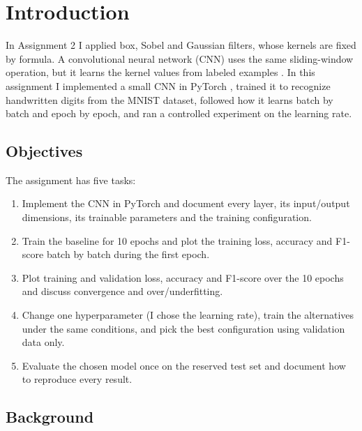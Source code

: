 \chapter{Introduction}
\label{ch:intro}


In Assignment 2 I applied box, Sobel and Gaussian filters, whose kernels
are fixed by formula. A convolutional neural network (CNN) uses the same
sliding-window operation, but it learns the kernel values from labeled
examples \citep{goodfellow2016}. In this assignment I implemented a small CNN in
PyTorch \citep{paszke2019}, trained it to recognize handwritten digits
from the MNIST dataset, followed how it learns batch by batch and epoch
by epoch, and ran a controlled experiment on the learning rate.

\section{Objectives}
\label{sec:objectives}

The assignment has five tasks:

\begin{enumerate}
  \item Implement the CNN in PyTorch and document every layer, its
        input/output dimensions, its trainable parameters and the
        training configuration.
  \item Train the baseline for 10 epochs and plot the training loss,
        accuracy and F1-score batch by batch during the first epoch.
  \item Plot training and validation loss, accuracy and F1-score over
        the 10 epochs and discuss convergence and over/underfitting.
  \item Change one hyperparameter (I chose the learning rate), train the
        alternatives under the same conditions, and pick the best
        configuration using validation data only.
  \item Evaluate the chosen model once on the reserved test set and
        document how to reproduce every result.
\end{enumerate}


\section{Background}
\label{sec:background}


